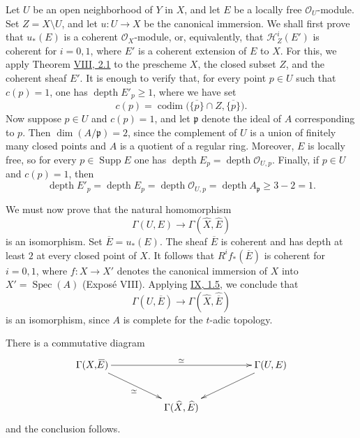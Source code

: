 Let $U$ be an open neighborhood of $Y$ in $X$, and let $E$ be a locally
free $\mathcal O_U$-module. Set $Z=X\setminus U$, and let
$u\colon U\to X$ be the canonical immersion. We shall first prove that
$u_*(E)$ is a coherent $\mathcal O_X$-module, or, equivalently, that
$\mathcal H^i_Z(E')$ is coherent for $i=0,1$, where $E'$ is a coherent
extension of $E$ to $X$. For this, we apply Theorem \hyperref[VIII.2.1]{VIII, 2.1} to the
prescheme $X$, the closed subset $Z$, and the coherent sheaf $E'$. It is
enough to verify that, for every point $p\in U$ such that $c(p)=1$, one has
$\operatorname{depth}E'_p\geq1$, where we have set
\[
  c(p)=\operatorname{codim}
  \bigl(\overline{\{p\}}\cap Z,\overline{\{p\}}\bigr).
\]
Now suppose $p\in U$ and $c(p)=1$, and let $\mathfrak p$ denote the ideal
of $A$ corresponding to $p$. Then $\dim(A/\mathfrak p)=2$, since the
complement of $U$ is a union of finitely many closed points and $A$ is a
quotient of a regular ring. Moreover, $E$ is locally free, so for every
$p\in\operatorname{Supp}E$ one has
$\operatorname{depth}E_p=\operatorname{depth}\mathcal O_{U,p}$. Finally,
if $p\in U$ and $c(p)=1$, then
\[
  \operatorname{depth}E'_p
  =\operatorname{depth}E_p
  =\operatorname{depth}\mathcal O_{U,p}
  =\operatorname{depth}A_{\mathfrak p}
  \geq3-2=1.
\]

We must now prove that the natural homomorphism
\begin{equation}\label{eq:X.1}
  \Gamma(U,E)\longrightarrow\Gamma(\widehat X,\widehat E)
\end{equation}
is an isomorphism. Set $\overline{\!E}=u_*(E)$. The sheaf
$\overline{\!E}$ is coherent and has depth at least $2$ at every closed
point of $X$. It follows that $R^if_*(\overline{\!E})$ is coherent for
$i=0,1$, where $f\colon X\to X'$ denotes the canonical immersion of $X$
into $X'=\operatorname{Spec}(A)$ (Exposé VIII). Applying \hyperref[IX.1.5]{IX, 1.5}, we
conclude that
\begin{equation}\label{eq:X.2}
  \Gamma(U,\overline{\!E})
  \longrightarrow
  \Gamma(\widehat X,\widehat{\overline{\!E}})
\end{equation}
is an isomorphism, since $A$ is complete for the $t$-adic topology.

There is a commutative diagram
\[
\xymatrix@C=18mm@R=9mm{
  \Gamma(X,\overline{\!E})
    \ar[rr]^{\simeq}
    \ar[dr]_{\simeq}
  && \Gamma(U,E)\ar[dl] \\
  & \Gamma(\widehat X,\widehat E) &
}
\]
and the conclusion follows.

